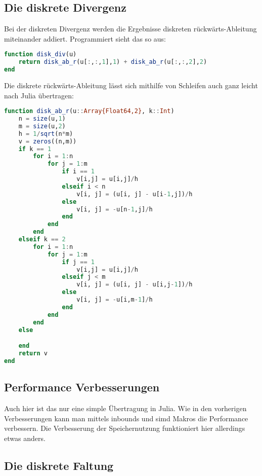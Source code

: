 \documentclass{article}
\theoremstyle{case}
\begin{document}
\subsection{Die diskrete Divergenz}
Bei der diskreten Divergenz werden die Ergebnisse diskreten rückwärts-Ableitung miteinander addiert. Programmiert sieht das so aus:
\begin{lstlisting}[language=Julia]
function disk_div(u)
	return disk_ab_r(u[:,:,1],1) + disk_ab_r(u[:,:,2],2)
end
\end{lstlisting}
Die diskrete rückwärts-Ableitung lässt sich mithilfe von Schleifen auch ganz leicht nach Julia übertragen:
\begin{lstlisting}[language=Julia]
function disk_ab_r(u::Array{Float64,2}, k::Int)
	n = size(u,1)
	m = size(u,2)
	h = 1/sqrt(n*m)
	v = zeros((n,m))
	if k == 1
		for i = 1:n
			for j = 1:m
				if i == 1
					v[i,j] = u[i,j]/h
				elseif i < n
					v[i, j] = (u[i, j] - u[i-1,j])/h
				else
					v[i, j] = -u[n-1,j]/h
				end
			end
		end
	elseif k == 2
		for i = 1:n
			for j = 1:m
				if j == 1
					v[i,j] = u[i,j]/h
				elseif j < m
					v[i, j] = (u[i, j] - u[i,j-1])/h
				else
					v[i, j] = -u[i,m-1]/h
				end
			end
		end
	else

	end
	return v
end
\end{lstlisting}


\subsection*{Performance Verbesserungen}
Auch hier ist das nur eine simple Übertragung in Julia. Wie in den vorherigen Verbesserungen kann man mittels inbounds und simd Makros die Performance verbessern. Die Verbesserung der Speichernutzung funktioniert hier allerdings etwas anders.


\subsection{Die diskrete Faltung}
\end{document}
